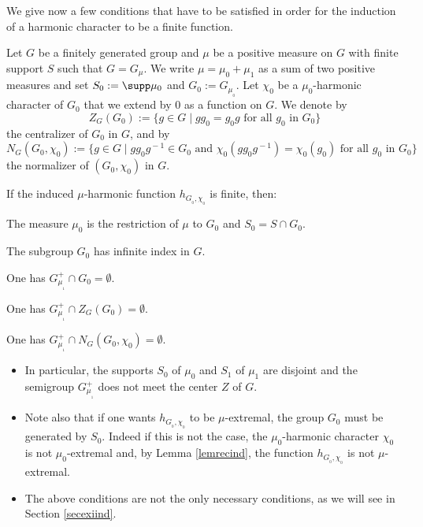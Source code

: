 \bq
We give now a few conditions that have to be satisfied
in order for the induction of a harmonic character to be a finite function.
\eq

Let $G$ be a finitely generated group and
$\mu$ be a positive measure on $G$ with finite support $S$
such that $G=G_\mu$.
We write $\mu =\mu_0+\mu_1$ as a sum of two positive measures
and set $S_0:=\supp\mu_0$ and $G_0:=G_{\mu_{_0}}$.
Let $\chi_0$ be a $\mu_0$-harmonic character of $G_0$
that we extend by $0$ as a function on $G$.
We denote by
\[
Z_G(G_0):=\{g\in G\mid gg_0=g_0g\text{ for all $g_0$ in $G_0$}\}
\]
the centralizer of $G_0$ in $G$, and by
\[
N_G(G_0,\chi_0):=\{g\in G\mid gg_0g^{\!-1}\!\!\in\! G_0
\text{ and } \chi_0(gg_0g^{\!-1})=\chi_0(g_0)\text{ for all $g_0$ in $G_0$}\}
\]
the normalizer of $(G_0,\chi_0)$ in $G$.

\begin{Lem}
\label{lemindcha}
If the induced $\mu$-harmonic function $h_{G_{_0},\chi_{_0}}$ is finite, then:
\begin{enumeratei}
\item\label{lemindchai}
The measure $\mu_0$ is the restriction of $\mu$ to $G_0$ and $S_0=S\cap G_0$.
\item\label{lemindchaii}
The subgroup $G_0$ has infinite index in $G$.
\item\label{lemindchaiii}
One has $G_{\mu_{_1}}^+\cap G_0=\emptyset$.
\item\label{lemindchaiv}
One has $G_{\mu_{_1}}^+\cap Z_G(G_0)=\emptyset$.
\item\label{lemindchav}
One has $G_{\mu_{_1}}^+\cap N_G(G_0,\chi_0)=\emptyset$.
\end{enumeratei}
\end{Lem}

\skpt
\begin{Rem}
\begin{itemize}
\item
In particular, the supports $S_0$ of $\mu_0$ and $S_1$ of $\mu_1$ are disjoint
and the semigroup $G_{\mu_{_1}}^+$ does not meet the center $Z$ of $G$.

\item
Note also that if one wants $h_{G_{_0},\chi_{_0}}$ to be $\mu$-extremal, the group
$G_0$ must be generated by $S_0$. Indeed if this is not the case,
the $\mu_0$-harmonic character $\chi_0$ is not $\mu_0$-extremal and,
by Lemma \ref{lemrecind},
the function $h_{G_{_0},\chi_{_0}}$ is not $\mu$-extremal.

\item
The above conditions are not the only necessary conditions,
as we will see in Section \ref{secexiind}.

\end{itemize}
\end{Rem}

